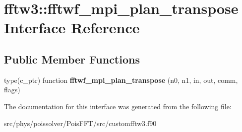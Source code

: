 \hypertarget{interfacefftw3_1_1fftwf__mpi__plan__transpose}{}\section{fftw3\+:\+:fftwf\+\_\+mpi\+\_\+plan\+\_\+transpose Interface Reference}
\label{interfacefftw3_1_1fftwf__mpi__plan__transpose}
\subsection*{Public Member Functions}
\begin{DoxyCompactItemize}
\item 
type(c\+\_\+ptr) function {\bfseries fftwf\+\_\+mpi\+\_\+plan\+\_\+transpose} (n0, n1, in, out, comm, flags)\hypertarget{interfacefftw3_1_1fftwf__mpi__plan__transpose_ac4c00c7cfb60dedfa1886139d9e45b36}{}\label{interfacefftw3_1_1fftwf__mpi__plan__transpose_ac4c00c7cfb60dedfa1886139d9e45b36}

\end{DoxyCompactItemize}


The documentation for this interface was generated from the following file\+:\begin{DoxyCompactItemize}
\item 
src/phys/poissolver/\+Pois\+F\+F\+T/src/customfftw3.\+f90\end{DoxyCompactItemize}
